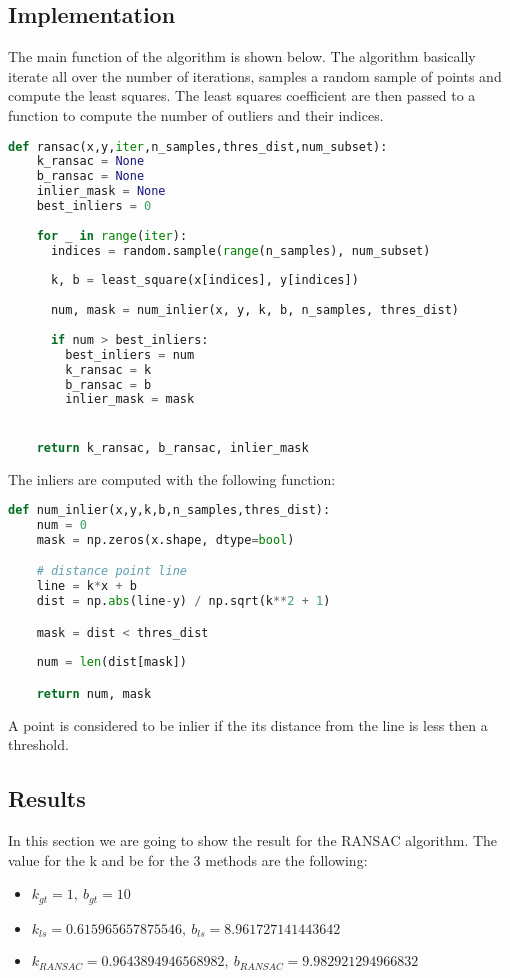 \documentclass{ETHExercise}
\begin{document}
\subsection{Implementation}

The main function of the algorithm is shown below. The algorithm
basically iterate all over the number of iterations, samples a random sample of
points and compute the least squares. The least squares coefficient are then 
passed to a function to compute the number of outliers and their indices.
\begin{lstlisting}[language=Python, caption=RANSAC]
  def ransac(x,y,iter,n_samples,thres_dist,num_subset):
    k_ransac = None
    b_ransac = None
    inlier_mask = None
    best_inliers = 0
  
    for _ in range(iter):
      indices = random.sample(range(n_samples), num_subset)
    
      k, b = least_square(x[indices], y[indices])
    
      num, mask = num_inlier(x, y, k, b, n_samples, thres_dist)
      
      if num > best_inliers:
        best_inliers = num
        k_ransac = k
        b_ransac = b
        inlier_mask = mask


    return k_ransac, b_ransac, inlier_mask
\end{lstlisting}

The inliers are computed with the following function:
\begin{lstlisting}[language=Python, caption=num\_inlier]
  def num_inlier(x,y,k,b,n_samples,thres_dist):
    num = 0
    mask = np.zeros(x.shape, dtype=bool)

    # distance point line
    line = k*x + b
    dist = np.abs(line-y) / np.sqrt(k**2 + 1)

    mask = dist < thres_dist
  
    num = len(dist[mask])

    return num, mask
\end{lstlisting}
A point is considered to be inlier if the its distance from the line is less then a threshold.


\subsection{Results}
In this section we are going to show the result for the RANSAC algorithm.
The value for the k and be for the 3 methods are the following:

\begin{itemize}
  \item $k_{gt} = 1,\ b_{gt} = 10$
  \item $k_{ls} = 0.615965657875546, \ b_{ls} = 8.961727141443642$
  \item $k_{RANSAC} = 0.9643894946568982,\ b_{RANSAC} = 9.982921294966832$
\end{itemize}
\end{document}
